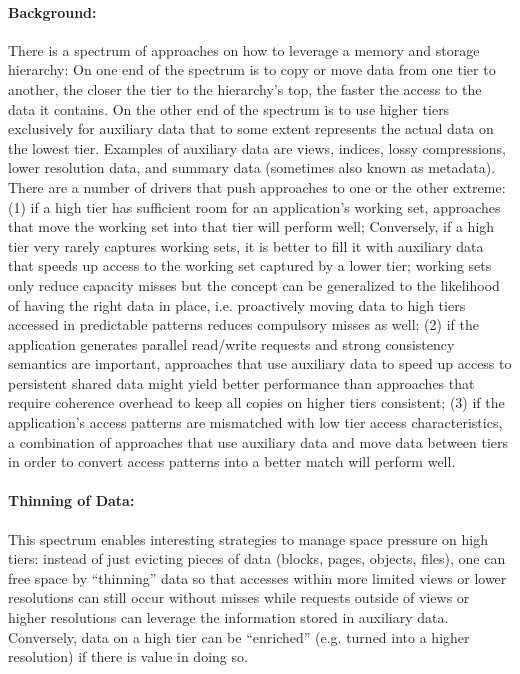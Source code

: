 \paragraph{Background:} There is a spectrum of approaches on how
to leverage a memory and storage hierarchy: On one end of the
spectrum is to copy or move data from one tier to another, the
closer the tier to the hierarchy's top, the faster the access to
the data it contains. On the other end of the spectrum is to use
higher tiers exclusively for auxiliary data that to some extent
represents the actual data on the lowest tier. Examples of auxiliary
data are views, indices, lossy compressions, lower resolution data,
and summary data (sometimes also known as metadata). There are a
number of drivers that push approaches to one or the other extreme:
(1) if a high tier has sufficient room for an application's working
set, approaches that move the working set into that tier will perform
well; Conversely, if a high tier very rarely captures working sets,
it is better to fill it with auxiliary data that speeds up access
to the working set captured by a lower tier; working sets only
reduce capacity misses but the concept can be generalized to the
likelihood of having the right data in place, i.e. proactively
moving data to high tiers accessed in predictable patterns reduces
compulsory misses as well; (2) if the application generates parallel
read/write requests and strong consistency semantics are important,
approaches that use auxiliary data to speed up access to persistent
shared data might yield better performance than approaches that
require coherence overhead to keep all copies on higher tiers
consistent; (3) if the application's access patterns are mismatched
with low tier access characteristics, a combination of approaches
that use auxiliary data and move data between tiers in order to
convert access patterns into a better match will perform well.

\paragraph{Thinning of Data:} 
This spectrum enables interesting strategies
to manage space pressure on high tiers: instead of just evicting
pieces of data (blocks, pages, objects, files), one can free space
by ``thinning'' data so that accesses within more limited views or
lower resolutions can still occur without misses while requests
outside of views or higher resolutions can leverage the information
stored in auxiliary data. Conversely, data on a high tier can be
``enriched'' (e.g. turned into a higher resolution) if there is
value in doing so.


